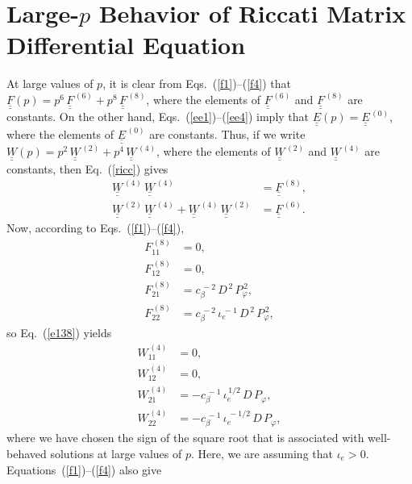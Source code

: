 \documentclass[12pt,prb,aps,notitlepage]{revtex4-1}
\begin{document}
\section{Large-$p$ Behavior of Riccati Matrix Differential Equation}
At large values of $p$, it is clear from Eqs.~(\ref{f1})--(\ref{f4}) that  $\underline{\underline{F}}(p)=p^6\,\underline{\underline{F}}^{\,(6)}+ p^8\,\underline{\underline{F}}^{\,(8)}$, where the elements of $\underline{\underline{F}}^{\,(6)}$ and $\underline{\underline{F}}^{\,(8)}$ are constants.
On the other hand, Eqs.~(\ref{ee1})--(\ref{ee4}) imply that $\underline{\underline{E}}(p)=\underline{\underline{E}}^{\,(0)}$, 
where the elements of $\underline{\underline{E}}^{\,(0)}$ are constants. 
Thus, if we write $\underline{\underline{W}}(p) = p^2\,\underline{\underline{W}}^{\,(2)}+p^4\,\underline{\underline{W}}^{\,(4)}$,
where the elements of $\underline{\underline{W}}^{\,(2)}$ and  $\underline{\underline{W}}^{\,(4)}$ are constants, then Eq.~(\ref{ricc}) gives 
\begin{align}\label{e138}
\underline{\underline{W}}^{\,(4)}\,\underline{\underline{W}}^{\,(4)}&= \underline{\underline{F}}^{\,(8)},\\[0.5ex]
\underline{\underline{W}}^{\,(2)}\,\underline{\underline{W}}^{\,(4)}+ \underline{\underline{W}}^{\,(4)}\,\underline{\underline{W}}^{\,(2)}&= 
\underline{\underline{F}}^{\,(6)}.\label{e139}
\end{align}
Now, according to Eqs.~(\ref{f1})--(\ref{f4}), 
\begin{align}
F^{\,(8)}_{11} &=0,\\[0.5ex]
F^{\,(8)}_{12} &= 0,\\[0.5ex]
F^{\,(8)}_{21} &= c_\beta^{\,-2}\,D^{\,2}\,P_\varphi^{\,2},\\[0.5ex]
F^{\,(8)}_{22} &= c_\beta^{\,-2}\,\iota_e^{\,-1}\,D^{\,2}\,P_\varphi^{\,2},
\end{align}
so Eq.~(\ref{e138}) yields 
\begin{align}
W^{\,(4)}_{11} &=0,\\[0.5ex]
W^{\,(4)}_{12} &= 0,\\[0.5ex]
W^{\,(4)}_{21} &= -c_\beta^{\,-1}\,\iota_e^{\,1/2}\,D\,P_\varphi,\\[0.5ex]
W^{\,(4)}_{22} &=-c_\beta^{\,-1}\,\iota_e^{\,-1/2}\, D\,P_\varphi,
\end{align}
where we have chosen the sign of the square root that is associated with well-behaved solutions at large values of $p$. Here, we are  assuming that $\iota_e>0$. 
Equations~(\ref{f1})--(\ref{f4}) also give 
\end{document}
